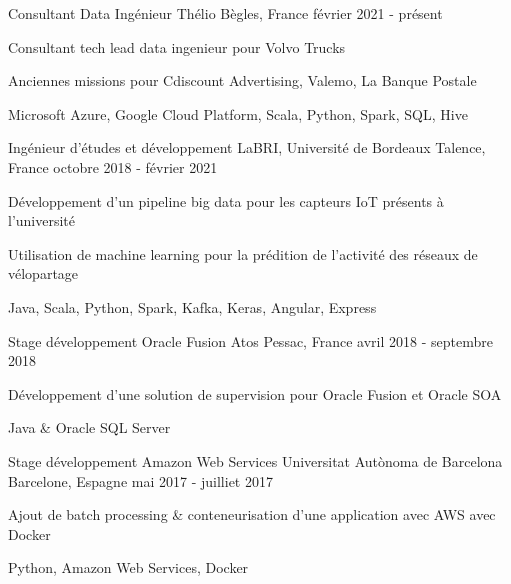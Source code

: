 
\begin{cventries}
	\cventry
	{Consultant Data Ingénieur}
	{Thélio}
	{Bègles, France}
	{février 2021 - présent}
	{
		\begin{cvitems}
			\item {Consultant tech lead data ingenieur pour Volvo Trucks}
			\item {Anciennes missions pour Cdiscount Advertising, Valemo, La Banque Postale}
			\item {Microsoft Azure, Google Cloud Platform, Scala, Python, Spark, SQL, Hive}
		\end{cvitems}
	}
	
	\cventry
	{Ingénieur d'études et développement}
	{LaBRI, Université de Bordeaux}
	{Talence, France}
	{octobre 2018 - février 2021}
	{
		\begin{cvitems}
			\item {Développement d'un pipeline big data pour les capteurs IoT présents à l'université}
			\item {Utilisation de machine learning pour la prédition de l'activité des réseaux de vélopartage}
			\item {Java, Scala, Python, Spark, Kafka, Keras, Angular, Express}
		\end{cvitems}
	}
	
	\cventry
	{Stage développement Oracle Fusion}
	{Atos}
	{Pessac, France}
	{avril 2018 - septembre 2018}
	{
		\begin{cvitems}
			\item {Développement d'une solution de supervision pour Oracle Fusion et Oracle SOA}
			\item {Java \& Oracle SQL Server}
		\end{cvitems}
	}
	
	\cventry
	{Stage développement Amazon Web Services}
	{Universitat Autònoma de Barcelona}
	{Barcelone, Espagne}
	{mai 2017 - juilliet 2017}
	{
		\begin{cvitems}
			\item {Ajout de batch processing \& conteneurisation d'une application avec AWS avec Docker}
			\item {Python, Amazon Web Services, Docker}
		\end{cvitems}
	}

\end{cventries}
